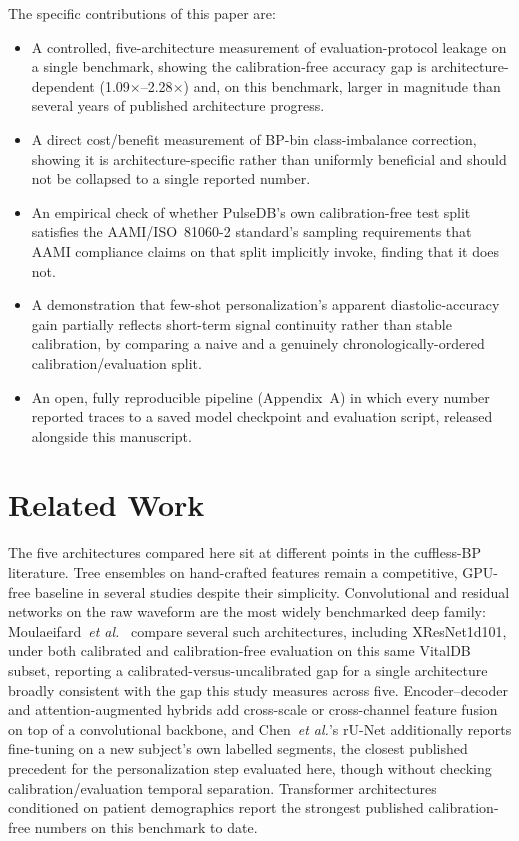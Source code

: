 \documentclass[journal]{IEEEtran}
\begin{document}
The specific contributions of this paper are:
\begin{itemize}
\item A controlled, five-architecture measurement of evaluation-protocol leakage on a single benchmark, showing the calibration-free accuracy gap is architecture-dependent (1.09$\times$--2.28$\times$) and, on this benchmark, larger in magnitude than several years of published architecture progress.
\item A direct cost/benefit measurement of BP-bin class-imbalance correction, showing it is architecture-specific rather than uniformly beneficial and should not be collapsed to a single reported number.
\item An empirical check of whether PulseDB's own calibration-free test split satisfies the AAMI/ISO~81060-2 standard's sampling requirements that AAMI compliance claims on that split implicitly invoke, finding that it does not.
\item A demonstration that few-shot personalization's apparent diastolic-accuracy gain partially reflects short-term signal continuity rather than stable calibration, by comparing a naive and a genuinely chronologically-ordered calibration/evaluation split.
\item An open, fully reproducible pipeline (Appendix~A) in which every number reported traces to a saved model checkpoint and evaluation script, released alongside this manuscript.
\end{itemize}

\section{Related Work}

The five architectures compared here sit at different points in the cuffless-BP literature. Tree ensembles on hand-crafted features remain a competitive, GPU-free baseline in several studies despite their simplicity. Convolutional and residual networks on the raw waveform are the most widely benchmarked deep family: Moulaeifard~\textit{et al.}~\cite{moulaeifard2025} compare several such architectures, including XResNet1d101, under both calibrated and calibration-free evaluation on this same VitalDB subset, reporting a calibrated-versus-uncalibrated gap for a single architecture broadly consistent with the gap this study measures across five. Encoder--decoder and attention-augmented hybrids \cite{chen2024,huang2024} add cross-scale or cross-channel feature fusion on top of a convolutional backbone, and Chen~\textit{et al.}'s rU-Net \cite{chen2024} additionally reports fine-tuning on a new subject's own labelled segments, the closest published precedent for the personalization step evaluated here, though without checking calibration/evaluation temporal separation. Transformer architectures conditioned on patient demographics \cite{arjomand2024,shen2026} report the strongest published calibration-free numbers on this benchmark to date.
\end{document}
